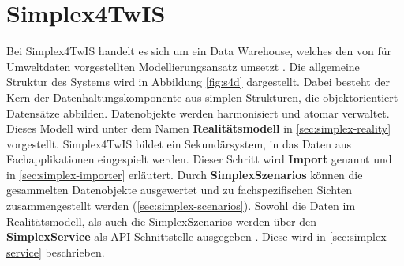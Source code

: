 \section{Simplex4TwIS}
\label{sec:s4d}

Bei Simplex4TwIS handelt es sich um ein Data Warehouse, welches den von \textcite{rudolfUmweltdatenmanagementGeoInspiration2018} für Umweltdaten vorgestellten Modellierungsansatz umsetzt \parencite{grossmannFachsystemeSchemaevolution2024}. Die allgemeine Struktur des Systems wird in Abbildung \ref{fig:s4d} dargestellt. Dabei besteht der Kern der Datenhaltungskomponente aus simplen Strukturen, die objektorientiert Datensätze abbilden. Datenobjekte werden harmonisiert und atomar verwaltet. Dieses Modell wird unter dem Namen \textbf{Realitätsmodell} in \ref{sec:simplex-reality} vorgestellt. Simplex4TwIS bildet ein Sekundärsystem, in das Daten aus Fachapplikationen eingespielt werden. Dieser Schritt wird \textbf{Import} genannt und in \ref{sec:simplex-importer} erläutert. Durch \textbf{SimplexSzenarios} können die gesammelten Datenobjekte ausgewertet und zu fachspezifischen Sichten zusammengestellt werden (\ref{sec:simplex-scenarios}). Sowohl die Daten im Realitätsmodell, als auch die SimplexSzenarios werden über den \textbf{SimplexService} als \acs{API}-Schnittstelle ausgegeben \parencite{grossmannEnvVisioService2022}. Diese wird in \ref{sec:simplex-service} beschrieben.

